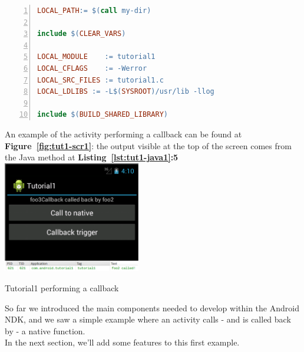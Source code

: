 \documentclass[a4paper,10pt]{article}
\makeatletter
\newenvironment{figurehere}{\def\@captype{figure}\vspace{2ex}}{\vspace{2ex}}
\newcommand{\reff}[1]{\textbf{Figure~\ref{#1}}}
\newcommand{\refl}[1]{\textbf{Listing~\ref{#1}}}
\makeatother
\begin{document}
\begin{multicols}{2}
\begin{lstlisting}[language=make,
				   columns=fullflexible,
				   showstringspaces=false,
				   xleftmargin=15pt,
				   frame = l,
				   numbers=left,
				   commentstyle=\color{gray}\upshape,
				   caption=Android.mk for tutorial1.c,
				   label=lst:tut1-c2]
LOCAL_PATH:= $(call my-dir)

include $(CLEAR_VARS)

LOCAL_MODULE    := tutorial1
LOCAL_CFLAGS    := -Werror
LOCAL_SRC_FILES := tutorial1.c
LOCAL_LDLIBS := -L$(SYSROOT)/usr/lib -llog

include $(BUILD_SHARED_LIBRARY)
\end{lstlisting}

An example of the activity performing a callback can be found at \reff{fig:tut1-scr1}: the output visible at the top of the screen comes from the Java method at \refl{lst:tut1-java1}\textbf{:5}\\

\begin{figurehere}
 \centering
 \includegraphics[width=6cm]{./figures/tut1-scr1.png}
 \caption{Tutorial1 performing a callback}
 \label{fig:tut1-scr1}
\end{figurehere}

So far we introduced the main components needed to develop within the Android NDK, and we saw a simple example where an activity calls - and is called back by - a native function.\\
In the next section, we'll add some features to this first example.



\end{multicols}
\end{document}
